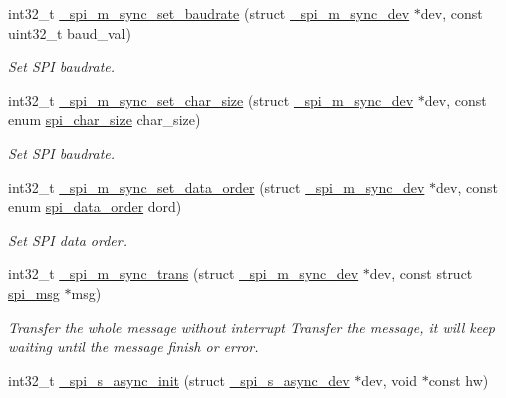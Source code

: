\begin{DoxyCompactItemize}
int32\+\_\+t \hyperlink{group__hpl__spi_ga9afbba219e80a3afa273c19c889dae3a}{\+\_\+spi\+\_\+m\+\_\+sync\+\_\+set\+\_\+baudrate} (struct \hyperlink{group__hpl__spi_ga7674622aeda62f2981f106e2d8221a5e}{\+\_\+spi\+\_\+m\+\_\+sync\+\_\+dev} $\ast$dev, const uint32\+\_\+t baud\+\_\+val)
\begin{DoxyCompactList}\small\item\em Set S\+PI baudrate. \end{DoxyCompactList}\item 
int32\+\_\+t \hyperlink{group__hpl__spi_gab3dbaa2147cc8f859c11a6fd2bf04a13}{\+\_\+spi\+\_\+m\+\_\+sync\+\_\+set\+\_\+char\+\_\+size} (struct \hyperlink{group__hpl__spi_ga7674622aeda62f2981f106e2d8221a5e}{\+\_\+spi\+\_\+m\+\_\+sync\+\_\+dev} $\ast$dev, const enum \hyperlink{group__hpl__spi_ga4a3ef460c2cea333834811806f32d60a}{spi\+\_\+char\+\_\+size} char\+\_\+size)
\begin{DoxyCompactList}\small\item\em Set S\+PI baudrate. \end{DoxyCompactList}\item 
int32\+\_\+t \hyperlink{group__hpl__spi_ga83403f5f3a201292ac93622f20278221}{\+\_\+spi\+\_\+m\+\_\+sync\+\_\+set\+\_\+data\+\_\+order} (struct \hyperlink{group__hpl__spi_ga7674622aeda62f2981f106e2d8221a5e}{\+\_\+spi\+\_\+m\+\_\+sync\+\_\+dev} $\ast$dev, const enum \hyperlink{group__hpl__spi_gabaa69dbc0601cb5b1e2681400598a4b2}{spi\+\_\+data\+\_\+order} dord)
\begin{DoxyCompactList}\small\item\em Set S\+PI data order. \end{DoxyCompactList}\item 
int32\+\_\+t \hyperlink{group__hpl__spi_ga7c3dd5d93fc342e6436bbce037b8b424}{\+\_\+spi\+\_\+m\+\_\+sync\+\_\+trans} (struct \hyperlink{group__hpl__spi_ga7674622aeda62f2981f106e2d8221a5e}{\+\_\+spi\+\_\+m\+\_\+sync\+\_\+dev} $\ast$dev, const struct \hyperlink{structspi__msg}{spi\+\_\+msg} $\ast$msg)
\begin{DoxyCompactList}\small\item\em Transfer the whole message without interrupt Transfer the message, it will keep waiting until the message finish or error. \end{DoxyCompactList}\item 
int32\+\_\+t \hyperlink{group__hpl__spi_gab7029f17c278df8b26d1b3dabc209a6c}{\+\_\+spi\+\_\+s\+\_\+async\+\_\+init} (struct \hyperlink{group__hpl__spi_ga7ac9e8d408bc498841e8e461ad8656aa}{\+\_\+spi\+\_\+s\+\_\+async\+\_\+dev} $\ast$dev, void $\ast$const hw)

\end{DoxyCompactItemize}
